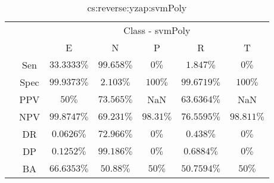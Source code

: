 \begin{table}[!ht]
	\centering
	\begin{tabular}{|c|c|c|c|c|c|c|}
		\cline{3-7}
		\multicolumn{2}{c|}{} & \multicolumn{5}{c|}{Class - svmPoly} \\ \cline{3-7}
		\multicolumn{2}{c|}{} & E & N & P & R & T \\ \hline
		\multirow{7}{*}{\rotatebox{90}{Statistics}} & Sen & $33.3333\%$ & $99.658\%$ & $0\%$ & $1.847\%$ & $0\%$ \\ \cline{2-7}
		 & Spec & $99.9373\%$ & $2.103\%$ & $100\%$ & $99.6719\%$ & $100\%$ \\ \cline{2-7}
		 & PPV & $50\%$ & $73.565\%$ & NaN & $63.6364\%$ & NaN \\ \cline{2-7}
		 & NPV & $99.8747\%$ & $69.231\%$ & $98.31\%$ & $76.5595\%$ & $98.811\%$ \\ \cline{2-7}
		 & DR & $0.0626\%$ & $72.966\%$ & $0\%$ & $0.438\%$ & $0\%$ \\ \cline{2-7}
		 & DP & $0.1252\%$ & $99.186\%$ & $0\%$ & $0.6884\%$ & $0\%$ \\ \cline{2-7}
		 & BA & $66.6353\%$ & $50.88\%$ & $50\%$ & $50.7594\%$ & $50\%$ \\ \hline
	\end{tabular}
	\caption{cs:reverse:yzap:svmPoly}
	\label{tab:cs:reverse:yzap:svmPoly}
\end{table}
